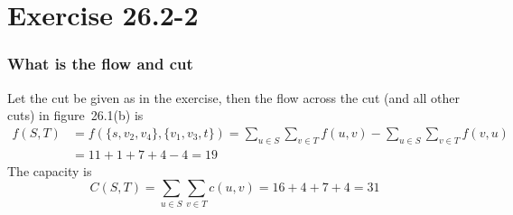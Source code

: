\section*{Exercise 26.2-2}
\subsubsection*{What is the flow and cut}
Let the cut be given as in the exercise, then the flow across the cut (and all other cuts) in figure~26.1(b) is 
\begin{align*}
f(S,T) &= f(\{s, v_2, v_4\},\{v_1, v_3,t\}) = \sum_{u \in S}\sum_{v \in T} f(u,v) - \sum_{u \in S}\sum_{v \in T} f(v,u) \\
       &= 11 + 1 + 7 + 4 - 4 = 19
\end{align*}
The capacity is
$$
C(S,T) = \sum_{u \in S}\sum_{v \in T} c(u,v) = 16 + 4 + 7 + 4 =31
$$